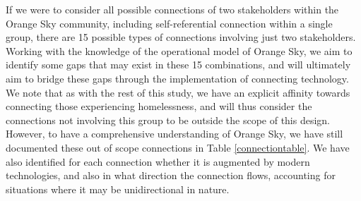 If we were to consider all possible connections of two stakeholders within the Orange Sky community, including self-referential connection within a single group, there are 15 possible types of connections involving just two stakeholders. Working with the knowledge of the operational model of Orange Sky, we aim to identify some gaps that may exist in these 15 combinations, and will ultimately aim to bridge these gaps through the implementation of connecting technology. We note that as with the rest of this study, we have an explicit affinity towards connecting those experiencing homelessness, and will thus consider the connections not involving this group to be outside the scope of this design. However, to have a comprehensive understanding of Orange Sky, we have still documented these out of scope connections in Table \ref{connectiontable}. We have also identified for each connection whether it is augmented by modern technologies, and also in what direction the connection flows, accounting for situations where it may be unidirectional in nature.

